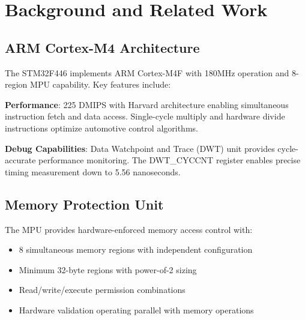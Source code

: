 \chapter{Background and Related Work}
\label{sec:backgrounds}

\section{ARM Cortex-M4 Architecture}

The STM32F446 implements ARM Cortex-M4F with 180MHz operation and 8-region MPU capability. Key features include:

\textbf{Performance}: 225 DMIPS with Harvard architecture enabling simultaneous instruction fetch and data access. Single-cycle multiply and hardware divide instructions optimize automotive control algorithms.

\textbf{Debug Capabilities}: Data Watchpoint and Trace (DWT) unit provides cycle-accurate performance monitoring. The DWT\_CYCCNT register enables precise timing measurement down to 5.56 nanoseconds.

\section{Memory Protection Unit}

The MPU provides hardware-enforced memory access control with:
\begin{itemize}
    \item 8 simultaneous memory regions with independent configuration
    \item Minimum 32-byte regions with power-of-2 sizing
    \item Read/write/execute permission combinations
    \item Hardware validation operating parallel with memory operations
\end{itemize}

